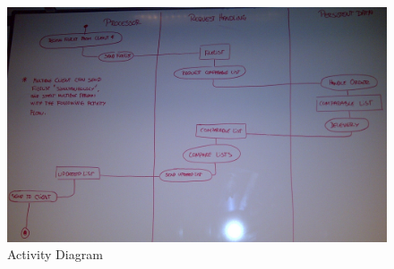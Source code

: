 \begin{figure}[H]
  \includegraphics[width=\textwidth,natwidth=2456,natheight=1522]{illustrations/ActivityDiagram.jpg}
  \caption{Activity Diagram}
  \label{activitydiagram}
\end{figure}
\newpage